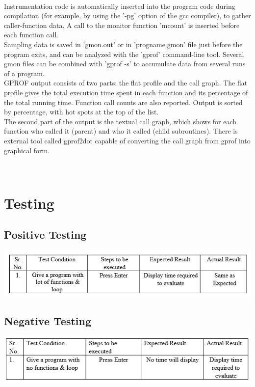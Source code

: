 \documentclass[a4paper,12pt]{article}
\begin{document}
	\paragraph{}
	\begin{itemize}
		 Instrumentation code is automatically inserted into the program code during compilation (for example, by using the '-pg' option of the gcc compiler), to gather caller-function data. A call to the monitor function 'mcount' is inserted before each function call.\\
       	Sampling data is saved in 'gmon.out' or in 'progname.gmon' file just before the program exits, and can be analyzed with the 'gprof' command-line tool. Several gmon files can be combined with 'gprof -s' to accumulate data from several runs of a program.\\
	   GPROF output consists of two parts: the flat profile and the call graph. The flat profile gives the total execution time spent in each function and its percentage of the total running time. Function call counts are also reported. Output is sorted by percentage, with hot spots at the top of the list.\\
   	The second part of the output is the textual call graph, which shows for each function who called it (parent) and who it called (child subroutines). There is external tool called gprof2dot capable of converting the call graph from gprof into graphical form.\\\\
   	\\

\section{Testing}   	
\subsection{Positive Testing}
\includegraphics[width=\textwidth]{gprof_positive}

\subsection{Negative Testing}
\includegraphics[width=\textwidth]{gprof_negative}
\newpage   	
   	

\end{itemize}
\end{document}
